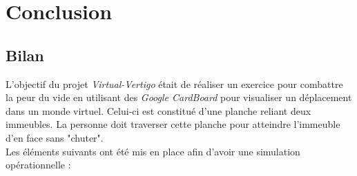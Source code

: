 \chapter{Conclusion}


\section{Bilan}
L'objectif du projet \textit{Virtual-Vertigo} était de réaliser un exercice pour combattre la peur du vide en utilisant des \textit{Google CardBoard} pour visualiser un déplacement dans un monde virtuel. Celui-ci est constitué d'une planche reliant deux immeubles. La personne doit traverser cette planche pour atteindre l'immeuble d'en face sans "chuter". \\

Les éléments suivants ont été mis en place afin d'avoir une simulation opérationnelle :

